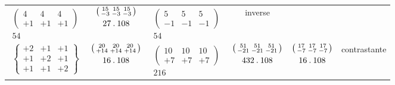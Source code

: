 \begin{center}
\begin{tabular}{ccccc l}
$\begin{gathered}\left(\begin{smallmatrix}4&4&4\\+1&+1&+1\end{smallmatrix}\right)\\54\end{gathered}$&
$\begin{gathered}\left(\begin{smallmatrix}15&15&15\\-3&-3&-3\end{smallmatrix}\right)\\27\mathbin{.}108\end{gathered}$&
$\begin{gathered}\left(\begin{smallmatrix}5&5&5\\-1&-1&-1\end{smallmatrix}\right)\\54\end{gathered}$&inverse\\[1.4ex]
$\left\{\begin{smallmatrix}+2&+1&+1\\+1&+2&+1\\+1&+1&+2\end{smallmatrix}\right\}$&
$\begin{gathered}\left(\begin{smallmatrix}20&20&20\\+14&+14&+14\end{smallmatrix}\right)\\16\mathbin{.}108\end{gathered}$&
$\begin{gathered}\left(\begin{smallmatrix}10&10&10\\+7&+7&+7\end{smallmatrix}\right)\\216\end{gathered}$&
$\begin{gathered}\left(\begin{smallmatrix}51&51&51\\-21&-21&-21\end{smallmatrix}\right)\\432\mathbin{.}108\end{gathered}$&
$\begin{gathered}\left(\begin{smallmatrix}17&17&17\\-7&-7&-7\end{smallmatrix}\right)\\16\mathbin{.}108\end{gathered}$&contrastante\\[1.4ex]

\end{tabular}
\end{center}

